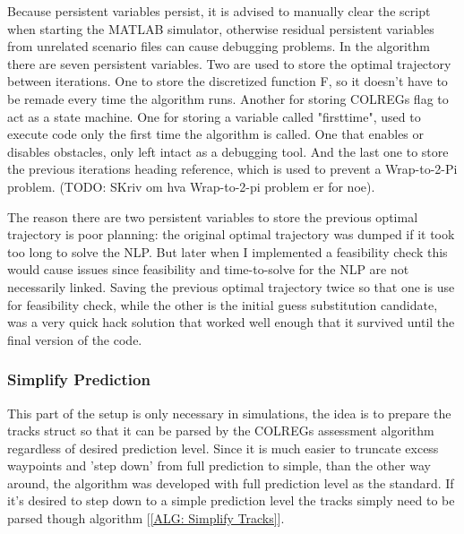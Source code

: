 Because persistent variables persist, it is advised to manually clear the script when starting the MATLAB simulator, otherwise
residual persistent variables from unrelated scenario files can cause debugging problems. In the algorithm there are seven
persistent variables. Two are used to store the optimal trajectory between iterations. One to store the discretized function F, so it doesn't have to be
remade every time the algorithm runs. Another for storing COLREGs flag to act as a state machine. One for storing a variable called "firsttime", 
used to execute code only the first time the algorithm is called. One that enables or disables obstacles, 
only left intact as a debugging tool. And the last one to store the previous iterations heading reference, which is used to prevent a
Wrap-to-2-Pi problem. (TODO: SKriv om hva Wrap-to-2-pi problem er for noe).

The reason there are two persistent variables to store the previous optimal trajectory is poor planning:
the original optimal trajectory was dumped if it took too long to solve the NLP. 
But later when I implemented a feasibility check this would cause issues since feasibility and time-to-solve for the NLP are not necessarily linked.
Saving the previous optimal trajectory twice so that one is use for feasibility check, while the other is the initial guess substitution candidate,
was a very quick hack solution that worked well enough that it survived until the final version of the code.


\subsubsection*{Simplify Prediction}
This part of the setup is only necessary in simulations, the idea is to prepare the tracks struct so that it can be parsed by the COLREGs assessment algorithm
regardless of desired prediction level. Since it is much easier to truncate excess waypoints and 'step down' from full prediction to simple, than the other way around, the algorithm
was developed with full prediction level as the standard. If it's desired to step down to a simple prediction level the tracks simply need to be parsed though algorithm [\ref{ALG: Simplify Tracks}].

